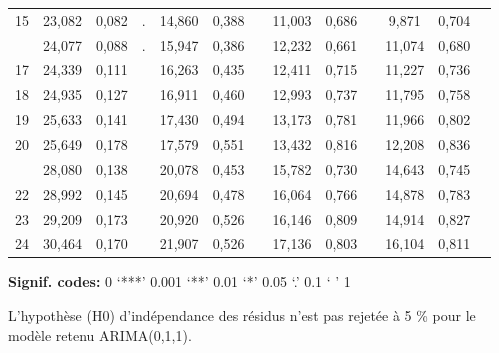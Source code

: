 \documentclass[french]{article}
\begin{document}
\begin{table}[!h]
{\begin{threeparttable}
\begin{tabular}[t]{ccccccccccccc}
15 & 23,082 & 0,082 & . & 14,860 & 0,388 &  & 11,003 & 0,686 &  & 9,871 & 0,704 & \\
\addlinespace
16 & 24,077 & 0,088 & . & 15,947 & 0,386 &  & 12,232 & 0,661 &  & 11,074 & 0,680 & \\
17 & 24,339 & 0,111 &  & 16,263 & 0,435 &  & 12,411 & 0,715 &  & 11,227 & 0,736 & \\
18 & 24,935 & 0,127 &  & 16,911 & 0,460 &  & 12,993 & 0,737 &  & 11,795 & 0,758 & \\
19 & 25,633 & 0,141 &  & 17,430 & 0,494 &  & 13,173 & 0,781 &  & 11,966 & 0,802 & \\
20 & 25,649 & 0,178 &  & 17,579 & 0,551 &  & 13,432 & 0,816 &  & 12,208 & 0,836 & \\
\addlinespace
21 & 28,080 & 0,138 &  & 20,078 & 0,453 &  & 15,782 & 0,730 &  & 14,643 & 0,745 & \\
22 & 28,992 & 0,145 &  & 20,694 & 0,478 &  & 16,064 & 0,766 &  & 14,878 & 0,783 & \\
23 & 29,209 & 0,173 &  & 20,920 & 0,526 &  & 16,146 & 0,809 &  & 14,914 & 0,827 & \\
24 & 30,464 & 0,170 &  & 21,907 & 0,526 &  & 17,136 & 0,803 &  & 16,104 & 0,811 & \\
\bottomrule
\end{tabular}
\begin{tablenotes}
\item \hspace{-0.4cm}\textbf{Signif. codes: }0 `***' 0.001 `**' 0.01 `*' 0.05 `.' 0.1 ` ' 1
\item L’hypothèse (H0) d'indépendance des résidus n’est pas rejetée à 5 \% pour le modèle retenu ARIMA(0,1,1).
\end{tablenotes}
\end{threeparttable}}
\end{table}
\end{document}
